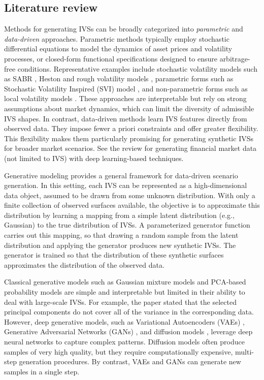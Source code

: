 \documentclass{article}
\begin{document}
\subsection{Literature review}
Methods for generating IVSs can be broadly categorized into \emph{parametric} and \emph{data-driven} approaches. Parametric methods typically employ stochastic differential equations to model the dynamics of asset prices and volatility processes, or closed-form functional specifications designed to ensure arbitrage-free conditions. Representative examples include stochastic volatility models such as SABR \citep{hagan2002managing}, Heston \citep{heston1993closed} and rough volatility models \citep{Bayer02062016},  parametric forms such as Stochastic Volatility Inspired (SVI) model \cite{gatheral2014arbitrage}, and non-parametric  forms such as local volatility models \citep{dupire1994pricing}. These approaches are interpretable but rely on strong assumptions about market dynamics, which can limit the diversity of admissible IVS shapes. In contrast, data-driven methods learn IVS features directly from observed  data. They impose fewer a priori constraints and offer greater flexibility. This flexibility makes them particularly promising for generating synthetic IVSs for broader market scenarios.  See the review \citep{horvath2025generative} for generating financial market data (not limited to IVS) with deep learning-based techniques. 


Generative modeling provides a general framework for data-driven scenario generation. In this setting, each IVS can be represented as a high-dimensional data object, assumed to be drawn from some unknown distribution. With only a finite collection of observed surfaces available, the objective is to approximate this distribution by learning a mapping from a simple latent distribution (e.g., Gaussian) to the true distribution of IVSs. A parameterized generator function carries out this mapping, so that drawing a random sample from the latent distribution and applying the generator produces new synthetic IVSs. The generator is trained so that the distribution of these synthetic surfaces approximates the distribution of the observed data.


Classical generative models such as Gaussian mixture models \citep{kienitz2024gaussian} and PCA-based probability models \citep{Cont04032023} are simple and interpretable but limited in their ability to deal with large-scale IVSs. For example,  the paper \citep{Cont04032023} stated that the selected  principal components do not cover all of the variance in the corresponding data.  However, deep generative models, such as Variational Autoencoders (VAEs) \citep{kingma2014semi}, Generative Adversarial Networks (GANs) \citep{goodfellow2014generative}, and diffusion models \citep{ho2020denoising}, leverage deep neural networks to capture complex patterns. Diffusion models often produce samples of very high quality, but they require computationally expensive, multi-step generation procedures. By contrast, VAEs and GANs can generate new samples in a single step.
\end{document}
